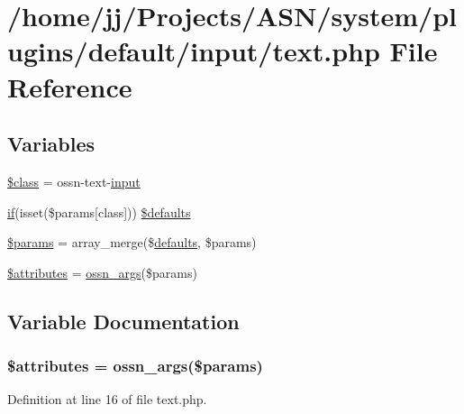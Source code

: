 \hypertarget{text_8php}{}\section{/home/jj/\+Projects/\+A\+S\+N/system/plugins/default/input/text.php File Reference}
\label{text_8php}
\subsection*{Variables}
\begin{DoxyCompactItemize}
\item 
\hyperlink{text_8php_a252ba022809910ea710a068fc1bab657}{\$class} = \textquotesingle{}ossn-\/text-\/\hyperlink{ossn_8lib_8input_8php_a64ebee98b041c4f75f71ed3cd73cc8ed}{input}\textquotesingle{}
\item 
\hyperlink{jquery_8tokeninput_8js_ad8dd46a3cbc004569e34401e9e71771a}{if}(isset(\$params\mbox{[}\textquotesingle{}class\textquotesingle{}\mbox{]})) \hyperlink{text_8php_a869093199c1f15238a97c4cf3af15f8d}{\$defaults}
\item 
\hyperlink{text_8php_afe68e6fbe7acfbffc0af0c84a1996466}{\$params} = array\+\_\+merge(\$\hyperlink{_chart_8_core_8js_afbaa35e32dd50615b39a75e1e5ec6921}{defaults}, \$params)
\item 
\hyperlink{text_8php_adc851f7a62250e75df0490c0280aef4c}{\$attributes} = \hyperlink{ossn_8lib_8views_8php_a90922f09de8a06ea85351afb51fac9f7}{ossn\+\_\+args}(\$params)
\end{DoxyCompactItemize}


\subsection{Variable Documentation}
\subsubsection[{\texorpdfstring{\$attributes}{$attributes}}]{\setlength{\rightskip}{0pt plus 5cm}\$attributes = {\bf ossn\+\_\+args}(\$params)}\hypertarget{text_8php_adc851f7a62250e75df0490c0280aef4c}{}\label{text_8php_adc851f7a62250e75df0490c0280aef4c}


Definition at line 16 of file text.\+php.


